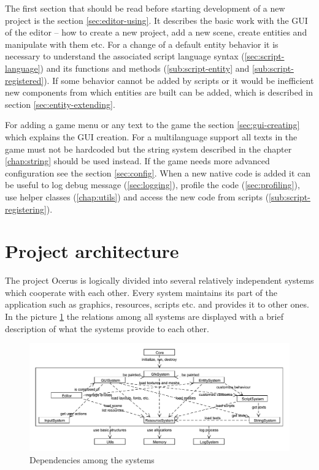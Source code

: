 \documentclass[a4paper, 12pt]{report}
\begin{document}
The first section that should be read before starting development of a new project is the section \ref{sec:editor-using}. It describes the basic work with the GUI of the editor -- how to create a new project, add a new scene, create entities and manipulate with them etc. For a change of a default entity behavior it is necessary to understand the associated script language syntax (\ref{sec:script-language}) and its functions and methods (\ref{sub:script-entity} and \ref{sub:script-registered}). If some behavior cannot be added by scripts or it would be inefficient new components from which entities are built can be added, which is described in section \ref{sec:entity-extending}.

For adding a game menu or any text to the game the section \ref{sec:gui-creating} which explains the GUI creation. For a multilanguage support all texts in the game must not be hardcoded but the string system described in the chapter \ref{chap:string} should be used instead. If the game needs more advanced configuration see the section \ref{sec:config}. When a new native code is added it can be useful to log debug message (\ref{sec:logging}), profile the code (\ref{sec:profiling}), use helper classes (\ref{chap:utils}) and access the new code from scripts (\ref{sub:script-registering}).

\section{Project architecture}

The project Ocerus is logically divided into several relatively independent systems which cooperate with each other. Every system maintains its part of the application such as graphics, resources, scripts etc. and provides it to other ones. In the picture \ref{fig:system-connection} the relations among all systems are displayed with a brief description of what the systems provide to each other.

\begin{figure}[htbp]
	\centering
		\includegraphics[width=1\textwidth]{SystemConnection.pdf}
	\caption{Dependencies among the systems}
	\label{fig:system-connection}
\end{figure}
\end{document}
